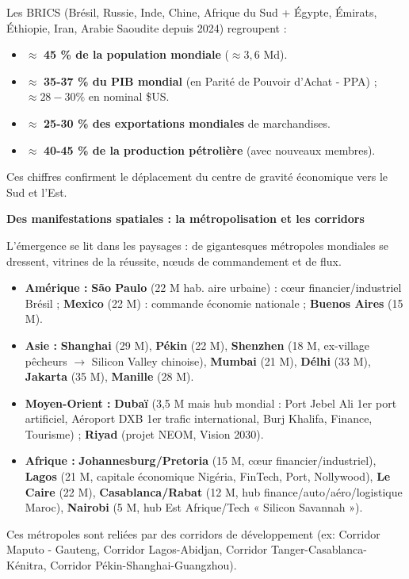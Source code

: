 \documentclass[11pt]{article}
\newcommand{\cle}[1]{{\popxbold\color{popdark}#1}}
\begin{document}
\begin{exemplebox}
Les \cle{BRICS} (Brésil, Russie, Inde, Chine, Afrique du Sud + Égypte, Émirats, Éthiopie, Iran, Arabie Saoudite depuis 2024) regroupent :
\begin{itemize}
\item $\approx$ \textbf{45 \% de la population mondiale} ($\approx 3,6$ Md).
\item $\approx$ \textbf{35-37 \% du PIB mondial} (en Parité de Pouvoir d'Achat - PPA) ; $\approx 28-30\%$ en nominal \$US.
\item $\approx$ \textbf{25-30 \% des exportations mondiales} de marchandises.
\item $\approx$ \textbf{40-45 \% de la production pétrolière} (avec nouveaux membres).
\end{itemize}
Ces chiffres confirment le déplacement du centre de gravité économique vers le Sud et l'Est.
\end{exemplebox}

\textbf{Des manifestations spatiales : la métropolisation et les corridors}\par

L'émergence se lit dans les paysages : de gigantesques \cle{métropoles mondiales} se dressent, vitrines de la réussite, nœuds de commandement et de flux.
\begin{itemize}
\item \textbf{Amérique :} \textbf{São Paulo} (22 M hab. aire urbaine) : cœur financier/industriel Brésil ; \textbf{Mexico} (22 M) : commande économie nationale ; \textbf{Buenos Aires} (15 M).
\item \textbf{Asie :} \textbf{Shanghai} (29 M), \textbf{Pékin} (22 M), \textbf{Shenzhen} (18 M, ex-village pêcheurs $\to$ Silicon Valley chinoise), \textbf{Mumbai} (21 M), \textbf{Délhi} (33 M), \textbf{Jakarta} (35 M), \textbf{Manille} (28 M).
\item \textbf{Moyen-Orient :} \textbf{Dubaï} (3,5 M mais hub mondial : Port Jebel Ali 1er port artificiel, Aéroport DXB 1er trafic international, Burj Khalifa, Finance, Tourisme) ; \textbf{Riyad} (projet NEOM, Vision 2030).
\item \textbf{Afrique :} \textbf{Johannesburg/Pretoria} (15 M, cœur financier/industriel), \textbf{Lagos} (21 M, capitale économique Nigéria, FinTech, Port, Nollywood), \textbf{Le Caire} (22 M), \textbf{Casablanca/Rabat} (12 M, hub finance/auto/aéro/logistique Maroc), \textbf{Nairobi} (5 M, hub Est Afrique/Tech « Silicon Savannah »).
\end{itemize}
Ces métropoles sont reliées par des \cle{corridors de développement} (ex: Corridor Maputo - Gauteng, Corridor Lagos-Abidjan, Corridor Tanger-Casablanca-Kénitra, Corridor Pékin-Shanghai-Guangzhou).
\end{document}
